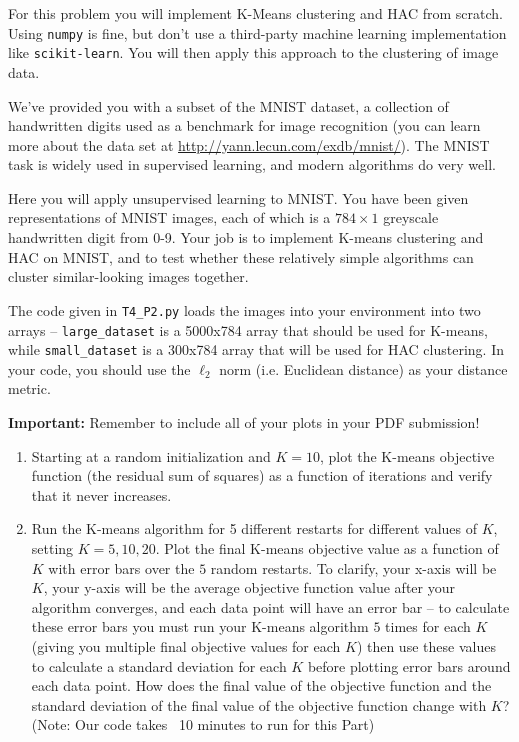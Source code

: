 \documentclass[submit]{harvardml}
\begin{document}
\begin{problem}


For this problem you will implement K-Means clustering and HAC from
scratch. Using \texttt{numpy} is fine, but don't use a third-party
machine learning implementation like \texttt{scikit-learn}. You will
then apply this approach to the clustering of image data.

We've provided you with a subset of the MNIST dataset, a collection of
handwritten digits used as a benchmark for image recognition (you can
learn more about the data set at
\url{http://yann.lecun.com/exdb/mnist/}). The MNIST task is widely
used in supervised learning, and modern algorithms do very well.

Here you will apply unsupervised learning to MNIST. You have been given
representations of MNIST images, each of which is a $784\times1$
greyscale handwritten digit from 0-9. Your job is to implement K-means
clustering and HAC on MNIST, and to test whether these relatively
simple algorithms can cluster similar-looking images together.

The code given in \texttt{T4\_P2.py} loads the images into your environment into two arrays -- \texttt{large\_dataset} is a 5000x784 array that should be used for K-means, while \texttt{small\_dataset} is a 300x784 array that will be used for HAC clustering. In your code, you should use the $\ell_2$ norm (i.e. Euclidean distance) as your distance metric.

\textbf{Important:} Remember to include all of your plots in your PDF submission!

\begin{enumerate}

\item Starting at a random initialization and $K = 10$, plot
  the K-means objective function (the residual sum of squares) as a function of iterations and verify
  that it never increases.

\item Run the K-means algorithm for 5 different restarts for different
  values of $K$, setting $K = 5, 10, 20$. Plot the final K-means objective value as a function
  of $K$ with error bars over the $5$ random restarts. To clarify, your
  x-axis will be $K$, your y-axis will be the average objective function value
  after your algorithm converges, and each data point will have an
  error bar -- to calculate these error bars you must run your K-means
  algorithm $5$ times for each $K$ (giving you multiple final objective values
  for each $K$) then use these values to calculate a standard deviation for
  each $K$ before plotting error bars around each data point. How
  does the final value of the objective function and the standard deviation of the final
  value of the objective function change with $K$? (Note: Our code takes ~10 minutes to run for this Part)
  

\end{enumerate}
\end{problem}
\end{document}
